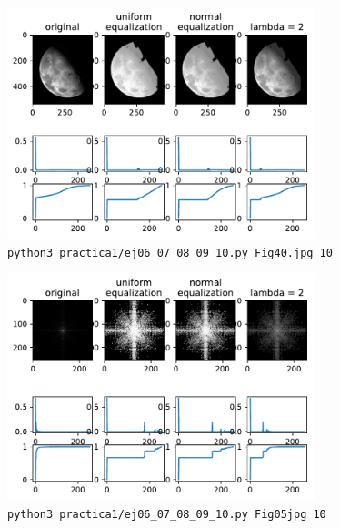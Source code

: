 \documentclass[11pt, spanish]{article}
\begin{document}
\begin{figure}[H]
\centering
  \includegraphics[width=0.8\textwidth]{informe-imgs/ej10-4.pdf}
  \caption{\texttt{python3 practica1/ej06\_07\_08\_09\_10.py Fig40.jpg 10}}
\end{figure}

\begin{figure}[H]
\centering
  \includegraphics[width=0.8\textwidth]{informe-imgs/ej10-5.pdf}
  \caption{\texttt{python3 practica1/ej06\_07\_08\_09\_10.py Fig05jpg 10}}
\end{figure}
\end{document}
